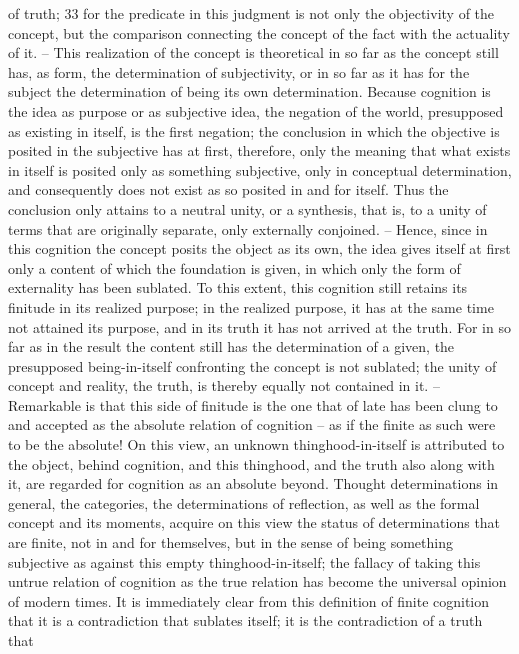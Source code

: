 of truth; 33 for the predicate in this judgment is not only the objectivity
of the concept, but the comparison connecting the concept of the fact with
the actuality of it. – This realization of the concept is theoretical in so far as
the concept still has, as form, the determination of subjectivity, or in so far
as it has for the subject the determination of being its own determination.
Because cognition is the idea as purpose or as subjective idea, the negation
of the world, presupposed as existing in itself, is the first negation; the
conclusion in which the objective is posited in the subjective has at first,
therefore, only the meaning that what exists in itself is posited only as
something subjective, only in conceptual determination, and consequently
does not exist as so posited in and for itself. Thus the conclusion only
attains to a neutral unity, or a synthesis, that is, to a unity of terms that
are originally separate, only externally conjoined. – Hence, since in this
cognition the concept posits the object as its own, the idea gives itself at first
only a content of which the foundation is given, in which only the form
of externality has been sublated. To this extent, this cognition still retains
its finitude in its realized purpose; in the realized purpose, it has at the
same time not attained its purpose, and in its truth it has not arrived at the
truth. For in so far as in the result the content still has the determination
of a given, the presupposed being-in-itself confronting the concept is not
sublated; the unity of concept and reality, the truth, is thereby equally not
contained in it. – Remarkable is that this side of finitude is the one that of
late has been clung to and accepted as the absolute relation of cognition –
as if the finite as such were to be the absolute! On this view, an unknown
thinghood-in-itself is attributed to the object, behind cognition, and this
thinghood, and the truth also along with it, are regarded for cognition as
an absolute beyond. Thought determinations in general, the categories, the
determinations of reflection, as well as the formal concept and its moments,
acquire on this view the status of determinations that are finite, not in and
for themselves, but in the sense of being something subjective as against
this empty thinghood-in-itself; the fallacy of taking this untrue relation of
cognition as the true relation has become the universal opinion of modern
times.
It is immediately clear from this definition of finite cognition that it is
a contradiction that sublates itself; it is the contradiction of a truth that
